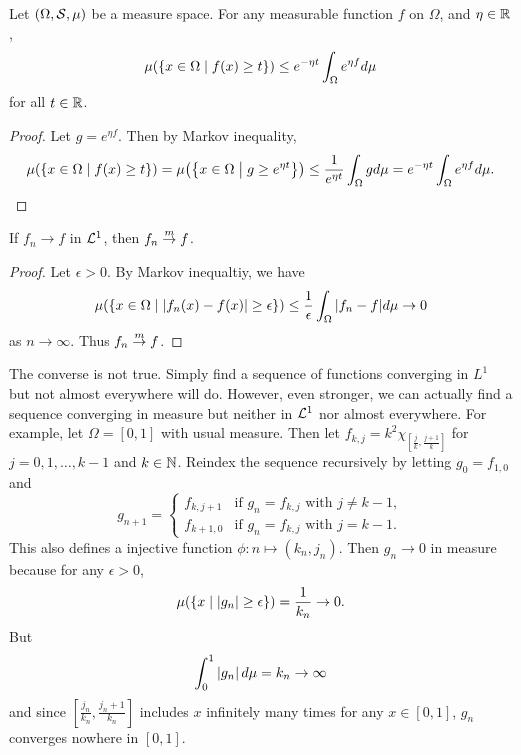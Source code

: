 \begin{corollary}
    Let $(\Omega, \S, \mu)$ be a measure space. For any measurable function $f$ on $\Omega$, 
    and $\eta\in\R$, 
    \begin{equation*}
        \mu\pth{\Set{x\in\Omega}{f(x)\geq t}} \leq e^{-\eta t}\int_\Omega e^{\eta f} d\mu
    \end{equation*}
    for all $t\in\R$.
\end{corollary}
\begin{proof}
    Let $g = e^{\eta f}$. Then by Markov inequality, 
    \begin{equation*}
        \mu\pth{\Set{x\in\Omega}{f(x)\geq t}} = \mu\pth{\Set{x\in\Omega}{g\geq e^{\eta t}}} 
        \leq \frac{1}{e^{\eta t}}\int_\Omega g d\mu = e^{-\eta t}\int_\Omega e^{\eta f} d\mu.
    \end{equation*}
\end{proof}

\begin{corollary}
    If $f_n\to f$ in $\L^1$, then $f_n\mto f$.
\end{corollary}
\begin{proof}
    Let $\epsilon>0$. By Markov inequaltiy, we have
    \begin{equation*}
        \mu\pth{\Set{x\in\Omega}{|f_n(x)-f(x)|\geq \epsilon}} \leq \frac{1}{\epsilon}\int_\Omega |f_n-f|d\mu 
        \to 0
    \end{equation*}
    as $n\to\infty$. Thus $f_n\mto f$.
\end{proof} 
\begin{remark}
    The converse is not true. Simply find a sequence of functions converging in $L^1$ 
    but not almost everywhere will do. However, even stronger, we can actually find 
    a sequence converging in measure but neither in $\L^1$ nor almost everywhere. 
    For example, let $\Omega = [0,1]$ with usual measure. Then let $f_{k,j} 
    = k^2\chi_{[\frac{j}{k}, \frac{j+1}{k}]}$ for $j = 0,1,\ldots,k-1$ and $k\in\N$. 
    Reindex the sequence recursively by letting $g_0 = f_{1,0}$ and 
    \begin{equation*}
        g_{n+1} = \begin{cases}
            f_{k,j+1} &\text{if } g_n = f_{k,j} \text{ with } j \neq k-1,\\ 
            f_{k+1,0} &\text{if } g_n = f_{k,j} \text{ with } j = k-1.
        \end{cases}
    \end{equation*}
    This also defines a injective function $\phi:n\mapsto (k_n,j_n)$. Then $g_n\to 0$ 
    in measure because for any $\epsilon>0$, 
    \begin{equation*}
        \mu\pth{\Set{x}{\abs{g_n}\geq \epsilon}} = \frac{1}{k_n}\to 0.
    \end{equation*}
    But 
    \begin{equation*}
        \int_0^1 \abs{g_n}d\mu = k_n\to\infty
    \end{equation*}
    and since $[\frac{j_n}{k_n}, \frac{j_n+1}{k_n}]$ includes $x$ infinitely many times for 
    any $x\in[0,1]$, $g_n$ converges nowhere in $[0,1]$.
\end{remark}

